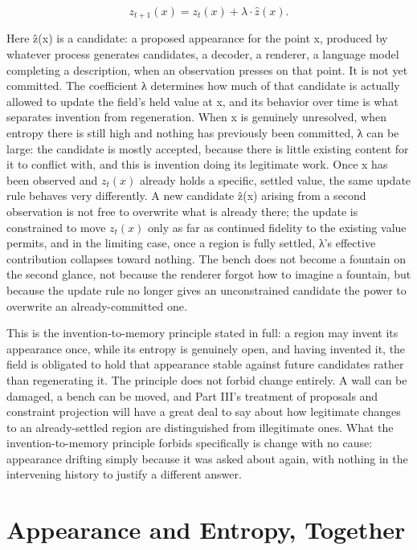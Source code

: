 \[ z_{t+1}(x) = z_t(x) + \lambda \cdot \hat{z}(x). \]

Here ẑ(x) is a candidate: a proposed appearance for the point x, produced by whatever process generates candidates, a decoder, a renderer, a language model completing a description, when an observation presses on that point. It is not yet committed. The coefficient λ determines how much of that candidate is actually allowed to update the field's held value at x, and its behavior over time is what separates invention from regeneration. When x is genuinely unresolved, when entropy there is still high and nothing has previously been committed, λ can be large: the candidate is mostly accepted, because there is little existing content for it to conflict with, and this is invention doing its legitimate work. Once x has been observed and \(z_t(x)\) already holds a specific, settled value, the same update rule behaves very differently. A new candidate ẑ(x) arising from a second observation is not free to overwrite what is already there; the update is constrained to move \(z_t(x)\) only as far as continued fidelity to the existing value permits, and in the limiting case, once a region is fully settled, λ's effective contribution collapses toward nothing. The bench does not become a fountain on the second glance, not because the renderer forgot how to imagine a fountain, but because the update rule no longer gives an unconstrained candidate the power to overwrite an already-committed one.

This is the invention-to-memory principle stated in full: a region may invent its appearance once, while its entropy is genuinely open, and having invented it, the field is obligated to hold that appearance stable against future candidates rather than regenerating it. The principle does not forbid change entirely. A wall can be damaged, a bench can be moved, and Part III's treatment of proposals and constraint projection will have a great deal to say about how legitimate changes to an already-settled region are distinguished from illegitimate ones. What the invention-to-memory principle forbids specifically is change with no cause: appearance drifting simply because it was asked about again, with nothing in the intervening history to justify a different answer.

\section{Appearance and Entropy, Together}

